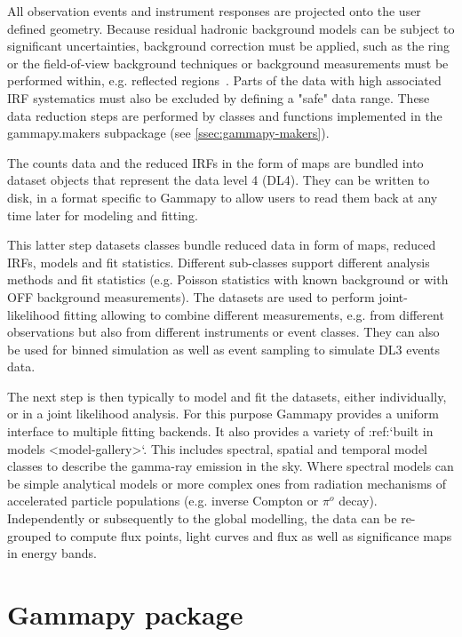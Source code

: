 All observation events and instrument responses are projected onto the
user defined geometry. Because residual hadronic background models can be subject
to significant uncertainties, background correction must be applied,
such as the ring or the field-of-view background techniques or
background measurements must be performed within, e.g. reflected regions~\citep{Berge07}.
Parts of the data with high associated IRF systematics must also be excluded by defining
a "safe" data range. These data reduction steps are performed by classes and functions
implemented in the gammapy.makers subpackage (see \ref{ssec:gammapy-makers}).

The counts data and the reduced IRFs in the form of maps are bundled into dataset objects
that represent the data level 4 (DL4). They can be written to
disk, in a format specific to Gammapy to allow users to read them back at any time later
for modeling and fitting.

This latter step
 datasets classes bundle reduced data in form of maps, reduced IRFs, models and
fit statistics. Different sub-classes support different analysis methods
and fit statistics (e.g. Poisson statistics with known background or
with OFF background measurements). The datasets are used to perform joint-likelihood
fitting allowing to combine different measurements, e.g. from different observations
but also from different instruments or event classes. They can also be used for binned
simulation as well as event sampling to simulate DL3 events data.

The next step is then typically to model and fit the datasets, either
individually, or in a joint likelihood analysis. For this purpose Gammapy
provides a uniform interface to multiple fitting backends. It also provides
a variety of :ref:`built in models <model-gallery>`. This includes spectral,
spatial and temporal model classes to describe the gamma-ray emission in the sky.
Where spectral models can be simple analytical models or more complex ones from radiation
mechanisms of accelerated particle populations (e.g. inverse Compton or $\pi^{o}$ decay).
Independently or subsequently to the global modelling, the data can be
re-grouped to compute flux points, light curves and flux as well as significance
maps in energy bands.

\section{Gammapy package}
\label{sec:gammapy-package}

